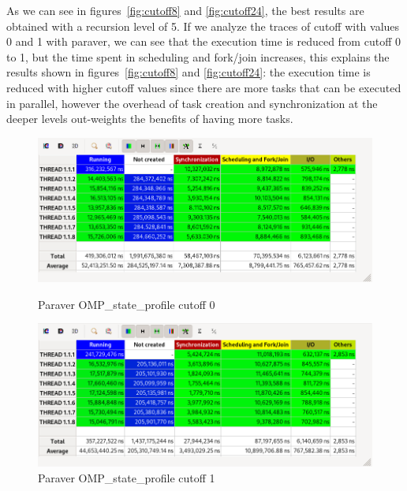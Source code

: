 As we can see in figures~\ref{fig:cutoff8} and \ref{fig:cutoff24}, the best results are obtained with a recursion
level of 5.
If we analyze the traces of cutoff with values 0 and 1 with paraver, we can see that the execution time is reduced
from cutoff 0 to 1, but the time spent in scheduling and fork/join increases, this explains the results shown in
figures~\ref{fig:cutoff8} and \ref{fig:cutoff24}: the execution time is reduced with higher cutoff values since
there are more tasks that can be executed in parallel, however the overhead of task creation and synchronization
at the deeper levels out-weights the benefits of having more tasks.


\begin{figure}[H]
    \begin{minipage}{0.5\textwidth}
        \centering
        \includegraphics[width=\linewidth]{captures/paraver_c0_total.png}
        \caption{Paraver OMP\_state\_profile cutoff 0}
        \label{fig:cutoffparaver0} 
    \end{minipage}
    \begin{minipage}{0.5\textwidth}
        \centering
        \includegraphics[width=\linewidth]{captures/paraver_c1_total.png}
        \caption{Paraver OMP\_state\_profile cutoff 1}
        \label{fig:cutoffparaver1} 
    \end{minipage}
\end{figure}

